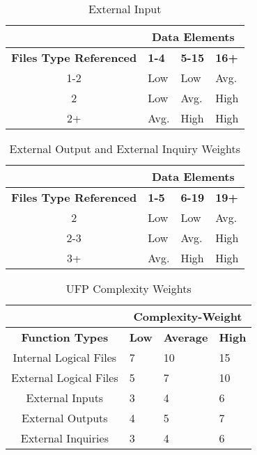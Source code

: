 \begin{table}[h]
\caption{External Input}
\begin{tabularx}{\textwidth}{|c|X|X|X|}
\hline
& \multicolumn{3}{|c|}{\textbf{Data Elements}}
\\ \hline
\textbf{\textbf{Files Type Referenced }}      & \textbf{1-4} & \textbf{5-15}   & \textbf{16+}
\\ \hline
1-2									   & Low           & Low              & Avg.
\\ \hline
2									   & Low           & Avg.             & High
\\ \hline
2+									   & Avg.          & High             & High
\\ \hline


\end{tabularx}
\end{table}

\begin{table}[h]
\caption{External Output and External Inquiry Weights}
\begin{tabularx}{\textwidth}{|c|X|X|X|}
\hline
& \multicolumn{3}{|c|}{\textbf{Data Elements}}
\\ \hline
\textbf{\textbf{Files Type Referenced }}      & \textbf{1-5} & \textbf{6-19}   & \textbf{19+}
\\ \hline
2									   & Low           & Low              & Avg.
\\ \hline
2-3									   & Low           & Avg.             & High
\\ \hline
3+  								   & Avg.          & High             & High
\\ \hline


\end{tabularx}
\end{table}

\begin{table}[h]
\caption{UFP Complexity Weights}
\begin{tabularx}{\textwidth}{|c|X|X|X|}
\hline
& \multicolumn{3}{|c|}{\textbf{Complexity-Weight}}
\\ \hline
\textbf{Function Types}   & \textbf{Low} & \textbf{Average}   & \textbf{High}
\\ \hline
Internal Logical Files 			   & 7          & 10             & 15
\\ \hline
External Logical Files             & 5          & 7				 & 10
\\ \hline
External Inputs             	   & 3          & 4				 & 6
\\ \hline
External Outputs                   & 4          & 5				 & 7
\\ \hline
External Inquiries                 & 3          & 4				 & 6
\\ \hline
\end{tabularx}
\end{table}


